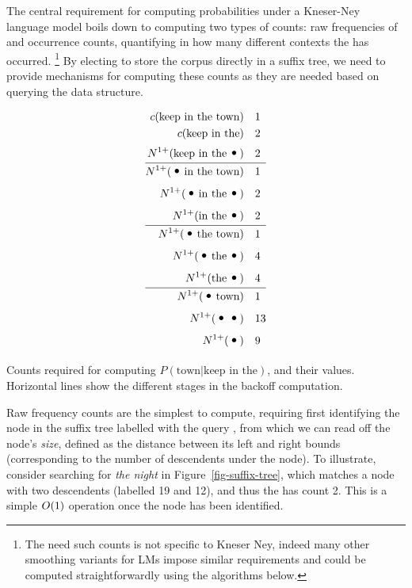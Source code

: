 
The central requirement for computing probabilities under a Kneser-Ney
language model boils down to computing two types of counts: raw
frequencies of \ngrams and occurrence counts, quantifying in how many different contexts the \ngram has occurred.%
\footnote{The need such counts is not specific to Kneser Ney, indeed
  many other smoothing variants for \ngram LMs impose similar
  requirements and could be computed straightforwardly using the algorithms below.}
By electing to store the corpus directly in a suffix tree, we need to
provide mechanisms for computing these counts as they are needed based
on querying the data structure.

\begin{table}
\begin{align*}
c(\text{keep in the town})  & \quad 1 \\
c(\text{keep in the}) & \quad 2 \\
\nlplus{\text{keep in the} \Bigcdot} & \quad 2 \\ \hline
\nlplus{\Bigcdot \text{in the town}} & \quad 1\\
\nlplus{\Bigcdot \text{in the} \Bigcdot} & \quad 2 \\
\nlplus{\text{in the} \Bigcdot} & \quad 2 \\ \hline
\nlplus{\Bigcdot \text{the town}} & \quad 1\\
\nlplus{\Bigcdot \text{the} \Bigcdot} & \quad 4 \\
\nlplus{\text{the} \Bigcdot} & \quad 4  \\ \hline
\nlplus{\Bigcdot \text{town}} & \quad 1 \\
\nlplus{\Bigcdot \Bigcdot} & \quad 13 \\ %
\nlplus{\Bigcdot} & \quad 9  %
\end{align*}
\caption{Counts required for computing $P(\text{town} | \text{keep in
    the})$, and their values. Horizontal lines show the different
  stages in the backoff computation.}
\end{table}

Raw frequency counts are the simplest to compute, requiring first
identifying the node in the suffix tree labelled with the query
\ngram, from which we can read off the node's \emph{size}, defined as the
distance between its left and right bounds (corresponding to the
number of descendents under the node). To illustrate, consider
searching for \emph{the night} in  Figure~\ref{fig-suffix-tree}, which
matches a node with two descendents (labelled 19 and 12), and thus the
\ngram has count 2. This is a simple $O(1)$ operation once the
node has been identified.

